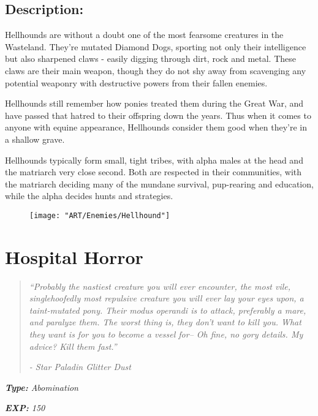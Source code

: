 \documentclass[11pt,a4paper,twocolumn]{book}
\begin{document}
	\subsection*{Description:}
	Hellhounds are without a doubt one of the most fearsome creatures in the Wasteland. They're mutated Diamond Dogs, sporting not only their intelligence but also sharpened claws - easily digging through dirt, rock and metal. These claws are their main weapon, though they do not shy away from scavenging any potential weaponry with destructive powers from their fallen enemies.
	
	Hellhounds still remember how ponies treated them during the Great War, and have passed that hatred to their offspring down the years. Thus when it comes to anyone with equine appearance, Hellhounds consider them good when they're in a shallow grave.
	
	Hellhounds typically form small, tight tribes, with alpha males at the head and the matriarch very close second. Both are respected in their communities, with the matriarch deciding many of the mundane survival, pup-rearing and education, while the alpha decides hunts and strategies.
	
	\begin{figure}[h]
		\centering
		\texttt{[image: "ART/Enemies/Hellhound"]}
	\end{figure}
	
	\clearpage
	
	\section*{Hospital Horror}
	\begin{quote}
		\emph{``Probably the nastiest creature you will ever encounter, the most vile, singlehoofedly most repulsive creature you will ever lay your eyes upon, a taint-mutated pony. Their modus operandi is to attack, preferably a mare, and paralyze them. The worst thing is, they don't want to kill you. What they want is for you to become a vessel for-- Oh fine, no gory details. My advice? Kill them fast.''}
		
		\emph{-	Star Paladin Glitter Dust}
	\end{quote}
	
	\noindent
	\emph{\textbf{Type:} Abomination}
	
	\noindent
	\emph{\textbf{EXP:} 150}
	
\end{document}

